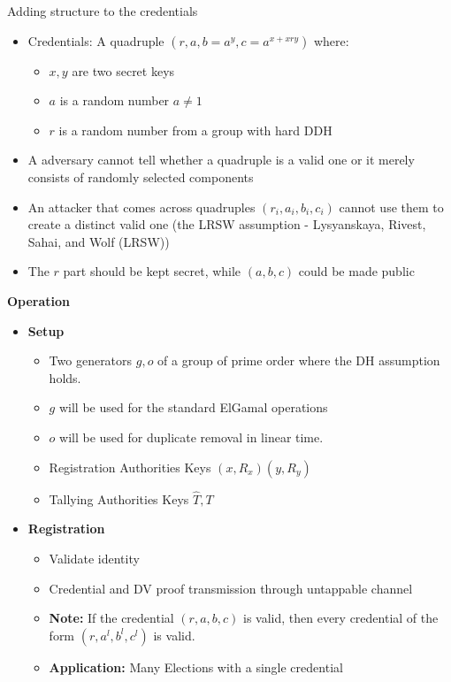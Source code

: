 \documentclass{beamer}
\begin{document}
\begin{frame}[allowframebreaks]{Adding structure to the credentials \cite{AraujoFT07}}
\begin{itemize}
\item Credentials: A quadruple $(r,a,b=a^y,c=a^{x+xry})$ where:
\begin{itemize}
\item $x,y$ are two secret keys 
\item  $a$ is a random number $a \neq 1$
\item  $r$ is a random number from a group with hard DDH
\end{itemize}
\item  A adversary cannot tell whether a quadruple is a valid one or it merely consists of randomly selected components
\item  An attacker that comes across quadruples $(r_i,a_i,b_i,c_i)$ cannot use them to create a distinct valid one (the LRSW assumption - Lysyanskaya,
Rivest, Sahai, and Wolf (LRSW))
\item  The $r$ part should be kept secret, while $(a,b,c)$ could be made public
\end{itemize}

\framebreak

\textbf{Operation}
 
\begin{itemize}
\item \textbf{Setup}
	\begin{itemize}
		\item Two generators $g,o$ of a group of prime order where the DH assumption holds. 
		\item $g$ will be used for the standard ElGamal operations 
		\item $o$ will be used for duplicate removal in linear time.
		\item Registration Authorities Keys $(x, R_x) (y, R_y) $ 
		\item Tallying Authorities Keys $\hat{T},T$ 
	\end{itemize}
\item \textbf{Registration}
	\begin{itemize}
		\item Validate identity
		\item Credential and DV proof transmission through untappable channel
		\item \textbf{Note:}  If the credential $(r,a,b,c)$ is valid, then every credential of the form $(r,a^l,b^l,c^l)$ is valid. 
		\item \textbf{Application: } Many Elections with a single credential
	\end{itemize}
	

\end{itemize}
\end{frame}
\end{document}

